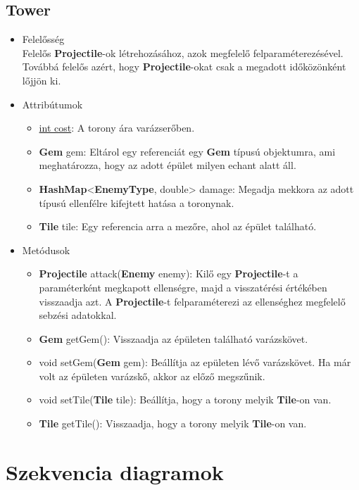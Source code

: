 \subsection{Tower}
\begin{itemize}
\item Felelősség\\
Felelős \textbf{Projectile}-ok létrehozásához, azok megfelelő felparaméterezésével. Továbbá felelős azért, hogy \textbf{Projectile}-okat csak a megadott időközönként lőjjön ki.
\item Attribútumok
	\begin{itemize}
		\item \underline{int cost}: A torony ára varázserőben.
		\item \textbf{Gem} gem: Eltárol egy referenciát egy \textbf{Gem} típusú objektumra, ami meghatározza, hogy az adott épület milyen echant alatt áll.
		\item \textbf{HashMap}<\textbf{EnemyType}, double> damage: Megadja mekkora az adott típusú ellenfélre kifejtett hatása a toronynak.
		\item \textbf{Tile} tile: Egy referencia arra a mezőre, ahol az épület található.
	\end{itemize}
\item Metódusok
	\begin{itemize}
		\item \textbf{Projectile} attack(\textbf{Enemy} enemy): Kilő egy \textbf{Projectile}-t a paraméterként megkapott ellenségre, majd a visszatérési értékében visszaadja azt. A \textbf{Projectile}-t felparaméterezi az ellenséghez megfelelő sebzési adatokkal.
		\item \textbf{Gem} getGem(): Visszaadja az épületen található varázskövet.
		\item void setGem(\textbf{Gem} gem): Beállítja az epületen lévő varázskövet. Ha már volt az épületen varázskő, akkor az előző megszűnik.
		\item void setTile(\textbf{Tile} tile): Beállítja, hogy a torony melyik \textbf{Tile}-on van.
		\item \textbf{Tile} getTile(): Visszaadja, hogy a torony melyik \textbf{Tile}-on van.
	\end{itemize}
\end{itemize}


\section{Szekvencia diagramok}

